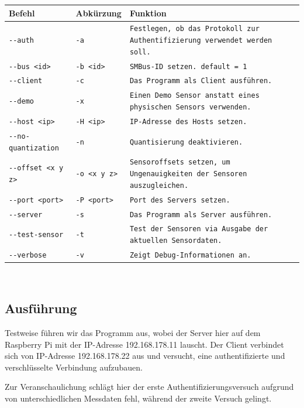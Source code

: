 \documentclass{article}
\begin{document}
\begin{tabular}{l|l|p{8cm}}
	\textbf{Befehl} & \textbf{Abkürzung} & \textbf{Funktion}\\
	\hline
	\texttt{-{}-auth} & \texttt{-a} & \texttt{Festlegen, ob das Protokoll zur Authentifizierung verwendet werden soll.}\\
	\texttt{-{}-bus <id>} & \texttt{-b <id>} & \texttt{SMBus-ID setzen. default = 1}\\
	\texttt{-{}-client} & \texttt{-c} & \texttt{Das Programm als Client ausführen.}\\
	\texttt{-{}-demo} & \texttt{-x} & \texttt{Einen Demo Sensor anstatt eines physischen Sensors verwenden.}\\
	\texttt{-{}-host <ip>} & \texttt{-H <ip>} & \texttt{IP-Adresse des Hosts setzen.}\\
	\texttt{-{}-no-quantization} & \texttt{-n} & \texttt{Quantisierung deaktivieren.}\\
	\texttt{-{}-offset <x y z>} & \texttt{-o <x y z>} & \texttt{Sensoroffsets setzen, um Ungenauigkeiten der Sensoren auszugleichen.}\\
	\texttt{-{}-port <port>} & \texttt{-P <port>} & \texttt{Port des Servers setzen.}\\
	\texttt{-{}-server} & \texttt{-s} & \texttt{Das Programm als Server ausführen.}\\
	\texttt{-{}-test-sensor} & \texttt{-t} & \texttt{Test der Sensoren via Ausgabe der aktuellen Sensordaten.}\\
	\texttt{-{}-verbose} & \texttt{-v} & \texttt{Zeigt Debug-Informationen an.}\\
	\hline
\end{tabular}\\

\subsection{Ausführung}

Testweise führen wir das Programm aus, wobei der Server hier auf dem Raspberry Pi mit der IP-Adresse 192.168.178.11 lauscht. Der Client verbindet sich von IP-Adresse 192.168.178.22 aus und versucht, eine authentifizierte und verschlüsselte Verbindung aufzubauen.

Zur Veranschaulichung schlägt hier der erste Authentifizierungsversuch aufgrund von unterschiedlichen Messdaten fehl, während der zweite Versuch gelingt.

\newpage
\end{document}
